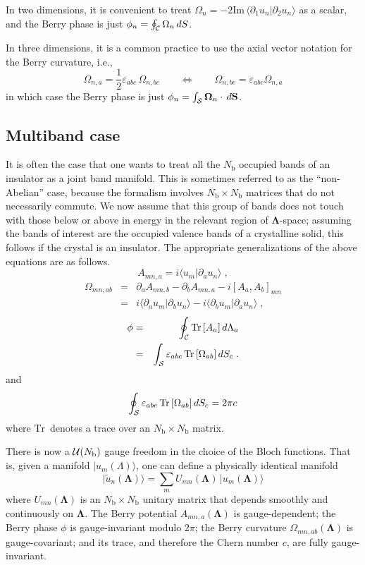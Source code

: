 \documentclass[11pt]{article}
\numberwithin{equation}{section} %
\def\nn{\nonumber\\}
\def\bea{\begin{eqnarray}}
\def\eea{\end{eqnarray}}
\def\beq{\begin{equation}}
\def\eeq{\end{equation}}
\renewcommand{\Im}{\textrm{Im}}
\def\ket#1{\vert #1 \rangle}
\def\ip#1#2{\langle #1 \vert #2 \rangle}
\def\O{{\Omega}}
\def\bO{\mathbf{\Omega}}
\def\pa{\partial_a}
\def\pb{\partial_b}
\def\L{\Lambda}
\def\bL{\mathbf{\Lambda}}
\def\Im{\textrm{Im}\,}
\def\Tr{\textrm{Tr}\,}
\def\cC{{\cal C}}
\def\cS{{\cal S}}
\def\ve{\varepsilon}
\def\Nb{N_\textrm{b}}
\def\half{\frac{\textstyle{1}}{\textstyle{2}}}
\begin{document}
In two dimensions, it is convenient to treat $\O_n=-2\Im
\ip{\partial_1 u_n}{\partial_2 u_n}$ as a scalar, and the Berry
phase is just $\phi_n=\oint_\cC \O_n\,dS$.

In three dimensions, it is a common practice to use the axial vector
notation for the Berry curvature, i.e.,
%
\beq
\O_{n,a}= \half  \ve_{abc}\,\O_{n,bc} \qquad\Leftrightarrow\qquad
\O_{n,bc} = \ve_{abc} \O_{n,a}
\eeq
%
in which case the Berry phase is just
$\phi_n=\int_\cS \bO_n\cdot\,d\mathbf{S}$.

\subsection{Multiband case}

It is often the case that one wants to treat all the $\Nb$ occupied
bands of an insulator as a joint band manifold.  This is sometimes
referred to as the ``non-Abelian'' case, because the formalism
involves $\Nb\times\Nb$ matrices that do not necessarily commute.
We now assume that this group of bands does not touch with those
below or above in energy in the relevant region of $\bL$-space;
assuming the bands of interest are the occupied valence bands of
a crystalline solid, this follows if the crystal is an insulator.
The appropriate generalizations of the above equations are
as follows.
%
\beq
A_{mn,a}=i\ip{u_m}{\pa u_n} \;,
\eeq
%
\bea
\O_{mn,ab} &=& \pa A_{mn,b} - \pb A_{mn,a} -i[A_a,A_b]_{mn} \nn
   &=&  i\ip{\pa u_m}{\pb u_n}-i\ip{\pb u_m}{\pa u_n} \;,
\eea
%
\bea
\phi
&=&\oint_\cC \Tr[A_a]\,d\L_a \label{eq:bp}\\
&=& \int_\cS \ve_{abc}\,\Tr[\O_{ab}]\,dS_c \;.
\eea
%
and
%
\beq
\oint_\cS \ve_{abc}\,\Tr[\O_{ab}]\,dS_c=2\pi c
\eeq
%
where $\Tr$ denotes a trace over an $\Nb\times\Nb$ matrix.

There is now a ${\cal U}(\Nb)$ gauge freedom in the choice of the
Bloch functions.  That is, given a manifold
$\ket{u_m(\L)}$, one can define a physically identical manifold
%
\beq
\ket{\tilde{u}_n(\bL)}=\sum_m U_{mn}(\bL)\,\ket{u_m(\bL)}
\eeq
%
where $U_{mn}(\bL)$ is an $\Nb\times\Nb$ unitary matrix that
depends smoothly and continuously on $\bL$.
The Berry potential $A_{mn,a}(\bL)$ is gauge-dependent;
the Berry phase $\phi$ is gauge-invariant modulo $2\pi$;
the Berry curvature $\O_{mn,ab}(\bL)$ is gauge-covariant;
and its trace, and therefore the Chern number $c$, are fully
gauge-invariant.
\end{document}
